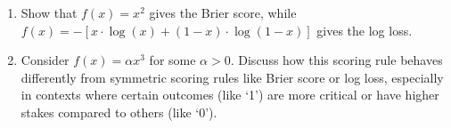 \documentclass[11pt]{article}
\begin{document}
\begin{enumerate}
\begin{enumerate}
    \item Show that \( f(x) = x^2 \) gives the Brier score, while \( f(x) = -\left[ x \cdot \log(x) + (1-x) \cdot \log(1-x) \right] \)  gives the log loss.
    
    \item Consider \( f(x) = \alpha x^3 \) for some \( \alpha > 0 \). Discuss how this scoring rule behaves differently from symmetric scoring rules like Brier score or log loss, especially in contexts where certain outcomes (like `1') are more critical or have higher stakes compared to others (like `0').
    
\end{enumerate}


\end{enumerate}
\end{document}
